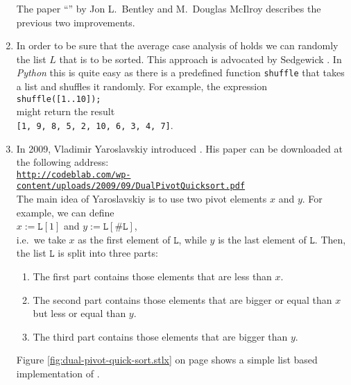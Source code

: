 \begin{enumerate}
      The paper ``'' by Jon L.~Bentley and M.~Douglas McIlroy
      \cite{bentley:93} describes the previous two improvements.
\item In order to be sure that the average case analysis of  holds we can randomly
       the list $L$ that is to be sorted.  This approach is advocated by Sedgewick
      \cite{sedgewick:2011}.  In \textsl{Python} this is quite easy as
      there is a predefined function \texttt{shuffle} that takes a list and shuffles it randomly.
      For example, the expression
      \\[0.2cm]
      \hspace*{1.3cm}
      \texttt{shuffle([1..10]);}
      \\[0.2cm]
      might return the result
      \\[0.2cm]
      \hspace*{1.3cm}
      \texttt{[1, 9, 8, 5, 2, 10, 6, 3, 4, 7]}.
\item In 2009, Vladimir Yaroslavskiy introduced  \cite{yaroslavskiy:2009}.  His paper can be
      downloaded at the following address:
      \\[0.2cm]
      \hspace*{-0.3cm}
      \href{http://codeblab.com/wp-content/uploads/2009/09/DualPivotQuicksort.pdf}{\texttt{http://codeblab.com/wp-content/uploads/2009/09/DualPivotQuicksort.pdf}}
      \\[0.2cm]
      The main idea of Yaroslavskiy is to use two pivot elements $x$ and $y$.  For example, we can
      define
      \\[0.2cm]
      \hspace*{1.3cm}
      $x := \mathtt{L}[1]$ \quad and \quad $y := \mathtt{L}[\#\mathtt{L}]$,
      \\[0.2cm]
      i.e.~we take $x$ as the first element of $\mathtt{L}$, while $y$ is the last element of
      $\mathtt{L}$.  Then, the list 
      $\mathtt{L}$ is split into three parts:
      \begin{enumerate}
      \item The first part contains those elements that are less than $x$.
      \item The second part contains those elements that are bigger or equal than $x$ but less or
            equal than $y$.
      \item The third part contains those elements that are bigger than $y$.
      \end{enumerate}
      Figure \ref{fig:dual-pivot-quick-sort.stlx} on page \pageref{fig:dual-pivot-quick-sort.stlx}
      shows a simple list based implementation of .




\end{enumerate}
